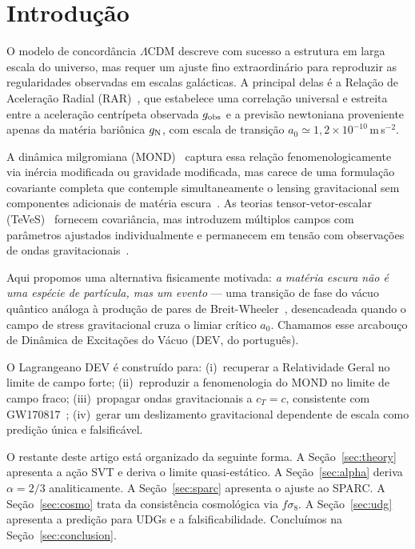 \documentclass[aps,prd,twocolumn,showpacs,superscriptaddress]{revtex4-2}
\newcommand{\aO}{a_0}
\newcommand{\gN}{g_{\rm N}}
\newcommand{\gobs}{g_{\rm obs}}
\newcommand{\LCDM}{$\Lambda$CDM}
\begin{document}
\maketitle

\section{Introdução}
\label{sec:intro}

O modelo de concordância \LCDM{} descreve com sucesso a estrutura
em larga escala do universo, mas requer um ajuste fino extraordinário
para reproduzir as regularidades observadas em escalas galácticas.
A principal delas é a Relação de Aceleração Radial
(RAR)~\cite{McGaugh2016}, que estabelece uma correlação universal
e estreita entre a aceleração centrípeta observada $\gobs$ e a
previsão newtoniana proveniente apenas da matéria bariônica $\gN$,
com escala de transição $\aO \simeq 1{,}2\times10^{-10}$\,m\,s$^{-2}$.

A dinâmica milgromiana (MOND)~\cite{Milgrom1983} captura essa
relação fenomenologicamente via inércia modificada ou gravidade
modificada, mas carece de uma formulação covariante completa que
contemple simultaneamente o lensing gravitacional sem componentes
adicionais de matéria escura~\cite{Clowe2006}.
As teorias tensor-vetor-escalar (TeVeS)~\cite{Bekenstein2004}
fornecem covariância, mas introduzem múltiplos campos com
parâmetros ajustados individualmente e permanecem em tensão com
observações de ondas gravitacionais~\cite{GW170817}.

Aqui propomos uma alternativa fisicamente motivada:
\emph{a matéria escura não é uma espécie de partícula, mas um
evento} — uma transição de fase do vácuo quântico análoga à
produção de pares de Breit-Wheeler~\cite{BreitWheeler1934},
desencadeada quando o campo de stress gravitacional cruza o
limiar crítico $\aO$.
Chamamos esse arcabouço de Dinâmica de Excitações do Vácuo (DEV,
do português).

O Lagrangeano DEV é construído para:
(i)~recuperar a Relatividade Geral no limite de campo forte;
(ii)~reproduzir a fenomenologia do MOND no limite de campo fraco;
(iii)~propagar ondas gravitacionais a $c_T = c$, consistente com
     GW170817~\cite{GW170817};
(iv)~gerar um deslizamento gravitacional dependente de escala
     como predição única e falsificável.

O restante deste artigo está organizado da seguinte forma.
A Seção~\ref{sec:theory} apresenta a ação SVT e deriva o limite
quasi-estático.
A Seção~\ref{sec:alpha} deriva $\alpha = 2/3$ analiticamente.
A Seção~\ref{sec:sparc} apresenta o ajuste ao SPARC.
A Seção~\ref{sec:cosmo} trata da consistência cosmológica via $f\sigma_8$.
A Seção~\ref{sec:udg} apresenta a predição para UDGs e a falsificabilidade.
Concluímos na Seção~\ref{sec:conclusion}.
\end{document}
